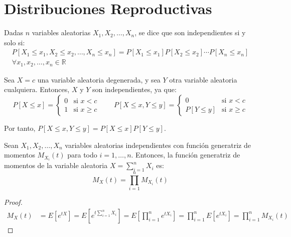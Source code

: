 \section{Distribuciones Reproductivas}

\begin{definicion}
    Dadas $n$ variables aleatorias $X_1,X_2,\ldots,X_n$, se dice que son independientes si y solo si:
    \begin{multline*}
        P[X_1\leq x_1, X_2\leq x_2,\ldots, X_n\leq x_n] = P[X_1\leq x_1]P[X_2\leq x_2]\cdots P[X_n\leq x_n] \\ \forall x_1,x_2,\ldots,x_n\in \mathbb{R}
    \end{multline*}    
\end{definicion}
\begin{ejemplo}
    Sea $X=c$ una variable aleatoria degenerada, y sea $Y$ otra variable aleatoria cualquiera. Entonces, $X$ y $Y$ son independientes, ya que:
    \begin{equation*}
        P[X\leq x] = \begin{cases}
            0 & \text{si } x< c \\
            1 & \text{si } x\geq c
        \end{cases}
        \qquad
        P[X\leq x, Y\leq y] = \begin{cases}
            0 & \text{si } x< c \\
            P[Y\leq y] & \text{si } x\geq c
        \end{cases}
    \end{equation*}

    Por tanto, $P[X\leq x, Y\leq y] = P[X\leq x]P[Y\leq y]$.
\end{ejemplo}

\begin{teo}\label{teo:generatriz_momentos_independientes}
    Sean $X_1,X_2,\ldots,X_n$ variables aleatorias independientes con función generatriz de momentos $M_{X_i}(t)$ para todo $i=1,\dots,n$. Entonces, la función generatriz de momentos de la variable aleatoria $X=\sum\limits_{i=1}^n X_i$ es:
    \begin{equation*}
        M_X(t)=\prod_{i=1}^n M_{X_i}(t)
    \end{equation*}
\end{teo}
\begin{proof}
    \begin{equation*}\begin{split}
        M_X(t)
        &= E[e^{tX}]
        = E\left[e^{t\sum\limits_{i=1}^n X_i}\right]
        = E\left[\prod_{i=1}^n e^{tX_i}\right]
        = \prod_{i=1}^n E[e^{tX_i}]
        = \prod_{i=1}^n M_{X_i}(t)
    \end{split}\end{equation*}

\end{proof}


